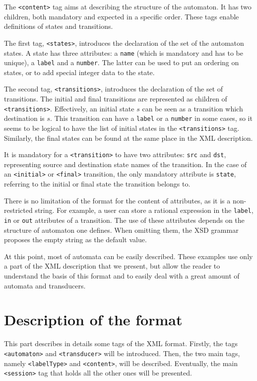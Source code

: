 \documentclass[a4paper]{article}
\newcommand{\xtag}[1]{\texttt{<#1>}}
\newcommand{\xattr}[1]{\texttt{#1}}
\begin{document}
The \xtag{content} tag aims at describing the structure of the
automaton. It has two children, both mandatory and expected
in a specific order. These tags enable definitions of states
and transitions.

The first tag, \xtag{states}, introduces the declaration of
the set of the automaton states. A state has three attributes: a
\xattr{name} (which is mandatory and has to be unique), a \xattr{label}
and a \xattr{number}. The latter can be used to put an ordering on states,
or to add special integer data to the state.

The second tag, \xtag{transitions}, introduces the declaration
of the set of transitions. The initial and final
transitions are represented as children of
\xtag{transitions}. Effectively, an initial state $s$ can be seen as a transition
which destination is $s$. This transition can have a \xattr{label} or a
\xattr{number} in some cases, so it seems to be logical to have the list of
initial states in the \xtag{transitions} tag.  Similarly, the final
states can be found at the same place in the XML description.

It is mandatory for a \xtag{transition} to have two attributes:
\xattr{src} and \xattr{dst}, representing source and destination state
names of the
transition. In the case of an \xtag{initial} or \xtag{final} transition,
the only mandatory attribute is \xattr{state}, referring to the initial
or final state the transition belongs to.

There is no limitation of the format for the content of attributes, as
it is a non-restricted string. For example, a user can store a
rational expression in the \xattr{label}, \xattr{in} or \xattr{out}
attributes of a transition. The use of these attributes depends on the
structure of automaton one defines. When omitting them, the XSD
grammar proposes the empty string as the default value.

At this point, most of automata can be easily described. These
examples use only a part of the XML description that we present, but
allow the reader to understand the basis of this format and to easily
deal with a great amount of automata and transducers.

\section{Description of the format}

This part describes in details some tags of the XML format.  Firstly,
the tags \xtag{automaton} and \xtag{transducer} will be introduced.
Then, the two main tags, namely \xtag{labelType} and \xtag{content}, will be
described.  Eventually, the main \xtag{session} tag that holds all the
other ones will be presented.
\end{document}
